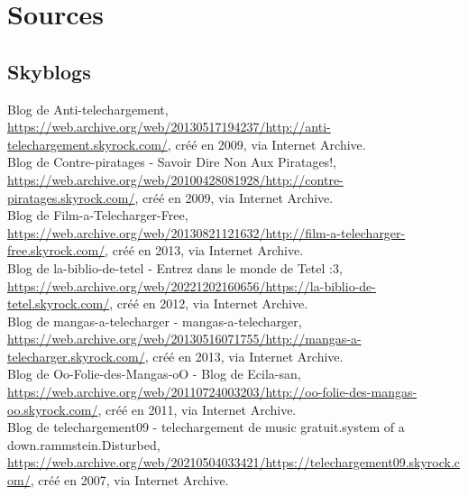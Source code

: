 \chapter{Sources}

\section*{Skyblogs}

Blog de Anti-telechargement, \href{https://web.archive.org/web/20130517194237/http://anti-telechargement.skyrock.com/}{https://web.archive.org/web/20130517194237/http://anti-telechargement.skyrock.com/}, créé en 2009, via Internet Archive. \\

Blog de Contre-piratages - Savoir Dire Non Aux Piratages!, \href{https://web.archive.org/web/20100428081928/http://contre-piratages.skyrock.com/}{https://web.archive.org/web/20100428081928/http://contre-piratages.skyrock.com/}, créé en 2009, via Internet Archive. \\

Blog de Film-a-Telecharger-Free, \href{https://web.archive.org/web/20130821121632/http://film-a-telecharger-free.skyrock.com/}{https://web.archive.org/web/20130821121632/http://film-a-telecharger-free.skyrock.com/}, créé en 2013,  via Internet Archive. \\

Blog de la-biblio-de-tetel - Entrez dans le monde de Tetel :3, \href{https://web.archive.org/web/20221202160656/https://la-biblio-de-tetel.skyrock.com/}{https://web.archive.org/web/20221202160656/https://la-biblio-de-tetel.skyrock.com/}, créé en 2012, via Internet Archive. \\

Blog de mangas-a-telecharger - mangas-a-telecharger, \href{https://web.archive.org/web/20130516071755/http://mangas-a-telecharger.skyrock.com/}{https://web.archive.org/web/20130516071755/http://mangas-a-telecharger.skyrock.com/}, créé en 2013, via Internet Archive. \\

Blog de Oo-Folie-des-Mangas-oO - Blog de Ecila-san, \href{https://web.archive.org/web/20110724003203/http://oo-folie-des-mangas-oo.skyrock.com/}{https://web.archive.org/web/20110724003203/http://oo-folie-des-mangas-oo.skyrock.com/}, créé en 2011, via Internet Archive. \\

Blog de telechargement09 - telechargement de music gratuit.system of a down.rammstein.Disturbed, \href{https://web.archive.org/web/20210504033421/https://telechargement09.skyrock.com/}{https://web.archive.org/web/20210504033421/https://telechargement09.skyrock.com/}, créé en 2007, via Internet Archive. \\

